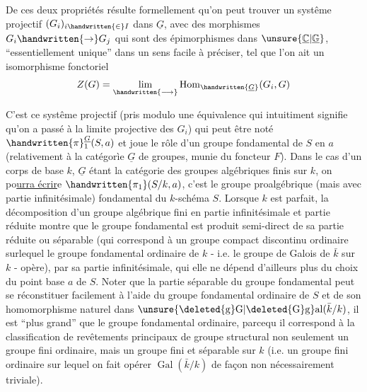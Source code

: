 
De ces deux propriétés résulte formellement qu'on peut trouver un systême projectif  $(G_i)_{i\handwritten{\in}I}$ dans $\underline{G}$, avec des morphismes $G_i\handwritten{\to}G_j$ qui sont des épimorphismes dans $\unsure{\underline{\mathbb{C}}|\underline{\mathbb{G}}}$, ``essentiellement unique'' dans un sens facile à préciser, tel que  l'on ait un isomorphisme fonctoriel
\[
Z(G)=\underset{\handwritten{\longrightarrow}}{\lim}\operatorname{Hom}_{\handwritten{\underline{G}}}(G_i,G)
\]

C'est ce systême projectif (pris modulo une équivalence qui intuitiment signifie qu'on a passé à la limite projective des $G_i$) qui peut être noté $\handwritten{\pi}^{\underline{G}}_1(S,a)$ et joue le rôle d'un groupe fondamental de $S$ en $a$ (relativement à la catégorìe $\underline{G}$ de groupes, munie du foncteur $F$). Dans le cas  d'un corps de base $k$, $\underline{G}$ étant la catégorie des groupes algébriques finis sur $k$, on po\uline{urra écrir}e $\handwritten{\pi_1}(S/k,a)$, c'est le groupe proalgébrique (mais avec partie infinitésimale) fondamental du $k$-schéma $S$. Lorsque $k$ est parfait, la décomposition d'un groupe algébrique fini en partie infinitésimale et partie réduite montre que le groupe fondamental est produit semi-direct de sa partie réduite ou séparable  (qui correspond à un groupe compact discontinu ordinaire\handwritten{,} surlequel le groupe fondamental ordinaire de $k$ - i.e. le groupe de Galois de $\bar{k}$ sur $k$ - opère), par sa partie infinitésimale,  qui elle ne dépend d'ailleurs plus du choix du point base $a$ de $S$. Noter que la partie séparable du groupe fondamental peut se réconstituer facilement à l'aide du groupe fondamental ordinaire de $S$ et de son homomorphisme naturel dans $\unsure{\deleted{\mathrm{g}}\mathrm{G}|\deleted{\mathrm{G}}\mathrm{g}}\mathrm{al}(\bar{k}/k)$,  il est ``plus grand'' que le groupe fondamental ordinaire, parce\inserted{\handwritten{\,}}qu il correspond à la classification de revêtements principaux de groupe structural non seulement un groupe fini ordinaire, mais un groupe  fini et séparable sur $k$ (i.e. un groupe fini ordinaire sur lequel on fait opérer $\operatorname{Gal}(\bar{k}/k)$ de façon non nécessairement triviale). 

